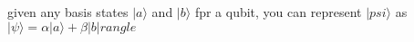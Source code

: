 \documentclass[preview]{standalone}
\begin{document}
\begin{center}
given any basis states $|a\rangle$ and $|b\rangle$ fpr a qubit, you can represent $|psi\rangle$ as $|\psi\rangle = \alpha|a\rangle + \beta|b|rangle$
\end{center}
\end{document}
